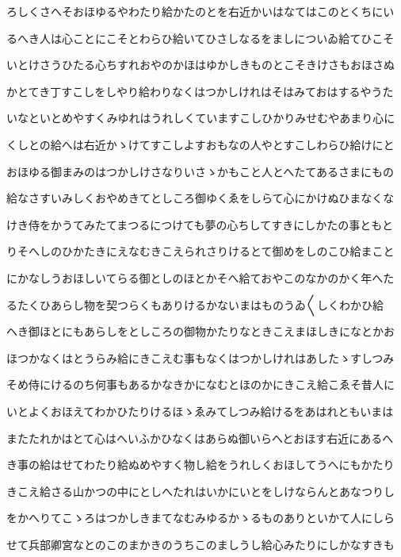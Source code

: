 \documentclass[a4paper,11pt,landscape]{ltjtarticle}
\begin{document}
\par\medskip
ろしくさへそおほゆるやわたり給かたのとを右近かいはなてはこのとくちにい
\par\medskip
るへき人は心ことにこそとわらひ給いてひさしなるをましについゐ給てひこそ
\par\medskip
いとけさうひたる心ちすれおやのかほはゆかしきものとこそきけさもおほさぬ
\par\medskip
かとてき丁すこしをしやり給わりなくはつかしけれはそはみておはするやうた
\par\medskip
いなといとめやすくみゆれはうれしくていますこしひかりみせむやあまり心に
\par\medskip
くしとの給へは右近かゝけてすこしよすおもなの人やとすこしわらひ給けにと
\par\medskip
おほゆる御まみのはつかしけさなりいさゝかもこと人とへたてあるさまにもの
\par\medskip
給なさすいみしくおやめきてとしころ御ゆくゑをしらて心にかけぬひまなくな
\par\medskip
けき侍をかうてみたてまつるにつけても夢の心ちしてすきにしかたの事ともと
\par\medskip
りそへしのひかたきにえなむきこえられさりけるとて御めをしのこひ給まこと
\par\medskip
にかなしうおほしいてらる御としのほとかそへ給ておやこのなかのかく年へた
\par\medskip
るたくひあらし物を契つらくもありけるかないまはものうゐ〱しくわかひ給
\par\medskip
へき御ほとにもあらしをとしころの御物かたりなときこえまほしきになとかお
\par\medskip
ほつかなくはとうらみ給にきこえむ事もなくはつかしけれはあしたゝすしつみ
\par\medskip
そめ侍にけるのち何事もあるかなきかになむとほのかにきこえ給こゑそ昔人に
\par\medskip
いとよくおほえてわかひたりけるほゝゑみてしつみ給けるをあはれともいまは
\par\medskip
またたれかはとて心はへいふかひなくはあらぬ御いらへとおほす右近にあるへ
\par\medskip
き事の給はせてわたり給ぬめやすく物し給をうれしくおほしてうへにもかたり
\par\medskip
きこえ給さる山かつの中にとしへたれはいかにいとをしけならんとあなつりし
\par\medskip
をかへりてこゝろはつかしきまてなむみゆるかゝるものありといかて人にしら
\par\medskip
せて兵部卿宮なとのこのまかきのうちこのましうし給心みたりにしかなすきも
\end{document}
